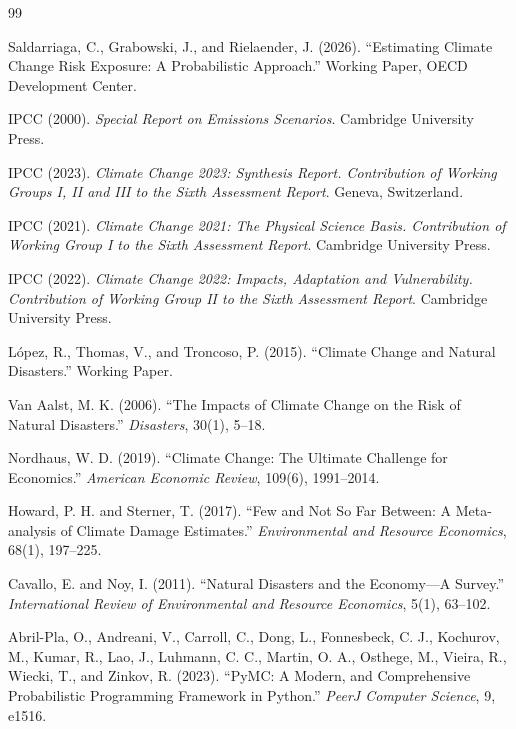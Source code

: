 \documentclass[11pt,a4paper]{article}
\begin{document}
\begin{thebibliography}{99}

Saldarriaga, C., Grabowski, J., and Rielaender, J. (2026).
``Estimating Climate Change Risk Exposure: A Probabilistic Approach.''
Working Paper, OECD Development Center.

IPCC (2000).
\textit{Special Report on Emissions Scenarios}.
Cambridge University Press.

IPCC (2023).
\textit{Climate Change 2023: Synthesis Report. Contribution of Working Groups I, II and III to the Sixth Assessment Report}.
Geneva, Switzerland.

IPCC (2021).
\textit{Climate Change 2021: The Physical Science Basis. Contribution of Working Group I to the Sixth Assessment Report}.
Cambridge University Press.

IPCC (2022).
\textit{Climate Change 2022: Impacts, Adaptation and Vulnerability. Contribution of Working Group II to the Sixth Assessment Report}.
Cambridge University Press.

L\'{o}pez, R., Thomas, V., and Troncoso, P. (2015).
``Climate Change and Natural Disasters.''
Working Paper.

Van Aalst, M. K. (2006).
``The Impacts of Climate Change on the Risk of Natural Disasters.''
\textit{Disasters}, 30(1), 5--18.

Nordhaus, W. D. (2019).
``Climate Change: The Ultimate Challenge for Economics.''
\textit{American Economic Review}, 109(6), 1991--2014.

Howard, P. H. and Sterner, T. (2017).
``Few and Not So Far Between: A Meta-analysis of Climate Damage Estimates.''
\textit{Environmental and Resource Economics}, 68(1), 197--225.

Cavallo, E. and Noy, I. (2011).
``Natural Disasters and the Economy---A Survey.''
\textit{International Review of Environmental and Resource Economics}, 5(1), 63--102.

Abril-Pla, O., Andreani, V., Carroll, C., Dong, L., Fonnesbeck, C. J., Kochurov, M., Kumar, R., Lao, J., Luhmann, C. C., Martin, O. A., Osthege, M., Vieira, R., Wiecki, T., and Zinkov, R. (2023).
``PyMC: A Modern, and Comprehensive Probabilistic Programming Framework in Python.''
\textit{PeerJ Computer Science}, 9, e1516.


\end{thebibliography}
\end{document}
